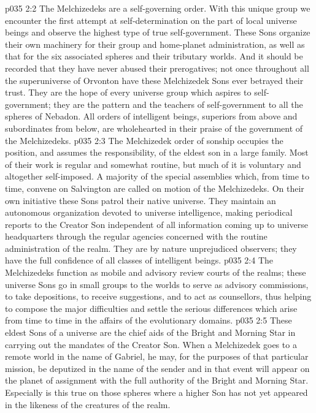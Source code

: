 \vs p035 2:2 The Melchizedeks are a self\hyp{}governing order. With this unique group we encounter the first attempt at self\hyp{}determination on the part of local universe beings and observe the highest type of true self\hyp{}government. These Sons organize their own machinery for their group and home\hyp{}planet administration, as well as that for the six associated spheres and their tributary worlds. And it should be recorded that they have never abused their prerogatives; not once throughout all the superuniverse of Orvonton have these Melchizedek Sons ever betrayed their trust. They are the hope of every universe group which aspires to self\hyp{}government; they are the pattern and the teachers of self\hyp{}government to all the spheres of Nebadon. All orders of intelligent beings, superiors from above and subordinates from below, are wholehearted in their praise of the government of the Melchizedeks.
\vs p035 2:3 \pc The Melchizedek order of sonship occupies the position, and assumes the responsibility, of the eldest son in a large family. Most of their work is regular and somewhat routine, but much of it is voluntary and altogether self\hyp{}imposed. A majority of the special assemblies which, from time to time, convene on Salvington are called on motion of the Melchizedeks. On their own initiative these Sons patrol their native universe. They maintain an autonomous organization devoted to universe intelligence, making periodical reports to the Creator Son independent of all information coming up to universe headquarters through the regular agencies concerned with the routine administration of the realm. They are by nature unprejudiced observers; they have the full confidence of all classes of intelligent beings.
\vs p035 2:4 The Melchizedeks function as mobile and advisory review courts of the realms; these universe Sons go in small groups to the worlds to serve as advisory commissions, to take depositions, to receive suggestions, and to act as counsellors, thus helping to compose the major difficulties and settle the serious differences which arise from time to time in the affairs of the evolutionary domains.
\vs p035 2:5 These eldest Sons of a universe are the chief aids of the Bright and Morning Star in carrying out the mandates of the Creator Son. When a Melchizedek goes to a remote world in the name of Gabriel, he may, for the purposes of that particular mission, be deputized in the name of the sender and in that event will appear on the planet of assignment with the full authority of the Bright and Morning Star. Especially is this true on those spheres where a higher Son has not yet appeared in the likeness of the creatures of the realm.
